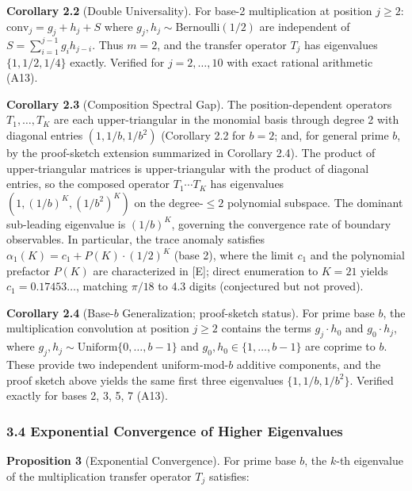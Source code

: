 \documentclass[
  11pt,
]{article}
\begin{document}
\textbf{Corollary 2.2} (Double Universality). For base-2 multiplication at
position \(j \geq 2\): \(\text{conv}_j = g_j + h_j + S\) where
\(g_j, h_j \sim \text{Bernoulli}(1/2)\) are independent of
\(S = \sum_{i=1}^{j-1} g_i h_{j-i}\). Thus \(m = 2\), and the transfer operator
\(T_j\) has eigenvalues \(\lbrace{}1, 1/2, 1/4\rbrace{}\) exactly. Verified for
\(j = 2, \ldots, 10\) with exact rational arithmetic (A13).

\textbf{Corollary 2.3} (Composition Spectral Gap). The position-dependent
operators \(T_1, \ldots, T_K\) are each upper-triangular in the monomial basis
through degree 2 with diagonal entries \((1, 1/b, 1/b^2)\) (Corollary 2.2 for
\(b=2\); and, for general prime \(b\), by the proof-sketch extension summarized
in Corollary 2.4). The product of upper-triangular matrices is upper-triangular
with the product of diagonal entries, so the composed operator
\(T_1 \cdots T_K\) has eigenvalues \((1, (1/b)^K, (1/b^2)^K)\) on the
degree-\(\leq 2\) polynomial subspace. The dominant sub-leading eigenvalue is
\((1/b)^K\), governing the convergence rate of boundary observables. In
particular, the trace anomaly satisfies
\(\alpha_1(K) = c_1 + P(K) \cdot (1/2)^K\) (base 2), where the limit \(c_1\) and
the polynomial prefactor \(P(K)\) are characterized in {[}E{]}; direct
enumeration to \(K = 21\) yields \(c_1 = 0.17453\ldots\), matching \(\pi/18\) to
4.3 digits (conjectured but not proved).

\textbf{Corollary 2.4} (Base-\(b\) Generalization; proof-sketch status). For
prime base \(b\), the multiplication convolution at position \(j \geq 2\)
contains the terms \(g_j \cdot h_0\) and \(g_0 \cdot h_j\), where
\(g_j, h_j \sim \text{Uniform}\lbrace{}0, \ldots, b-1\rbrace{}\) and
\(g_0, h_0 \in \lbrace{}1, \ldots, b-1\rbrace{}\) are coprime to \(b\). These
provide two independent uniform-mod-\(b\) additive components, and the proof
sketch above yields the same first three eigenvalues
\(\lbrace{}1, 1/b, 1/b^2\rbrace{}\). Verified exactly for bases 2, 3, 5, 7
(A13).

\subsubsection{3.4 Exponential Convergence of Higher
Eigenvalues}\label{exponential-convergence-of-higher-eigenvalues}

\textbf{Proposition 3} (Exponential Convergence). For prime base \(b\), the
\(k\)-th eigenvalue of the multiplication transfer operator \(T_j\) satisfies:
\end{document}
